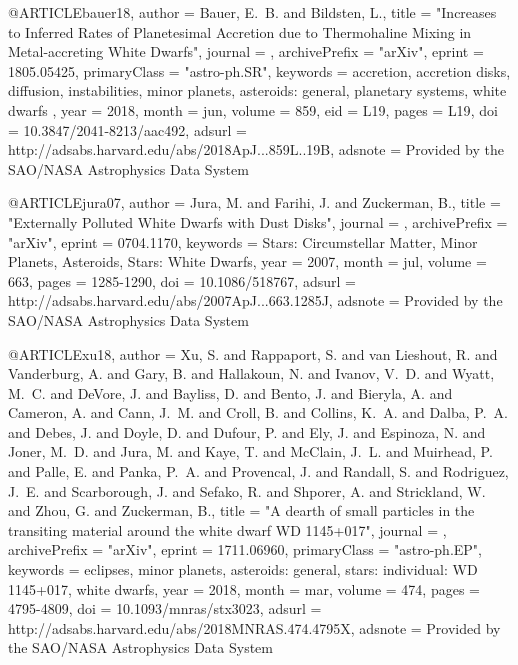 \documentclass[a4paper,fleqn,usenatbib]{mnras}
\begin{document}
{{{{{{@ARTICLE{bauer18,
   author = {{Bauer}, E.~B. and {Bildsten}, L.},
    title = "{Increases to Inferred Rates of Planetesimal Accretion due to Thermohaline Mixing in Metal-accreting White Dwarfs}",
  journal = {\apjl},
archivePrefix = "arXiv",
   eprint = {1805.05425},
 primaryClass = "astro-ph.SR",
 keywords = {accretion, accretion disks, diffusion, instabilities, minor planets, asteroids: general, planetary systems, white dwarfs },
     year = 2018,
    month = jun,
   volume = 859,
      eid = {L19},
    pages = {L19},
      doi = {10.3847/2041-8213/aac492},
   adsurl = {http://adsabs.harvard.edu/abs/2018ApJ...859L..19B},
  adsnote = {Provided by the SAO/NASA Astrophysics Data System}
}


@ARTICLE{jura07,
   author = {{Jura}, M. and {Farihi}, J. and {Zuckerman}, B.},
    title = "{Externally Polluted White Dwarfs with Dust Disks}",
  journal = {\apj},
archivePrefix = "arXiv",
   eprint = {0704.1170},
 keywords = {Stars: Circumstellar Matter, Minor Planets, Asteroids, Stars: White Dwarfs},
     year = 2007,
    month = jul,
   volume = 663,
    pages = {1285-1290},
      doi = {10.1086/518767},
   adsurl = {http://adsabs.harvard.edu/abs/2007ApJ...663.1285J},
  adsnote = {Provided by the SAO/NASA Astrophysics Data System}
}

@ARTICLE{xu18,
   author = {{Xu}, S. and {Rappaport}, S. and {van Lieshout}, R. and {Vanderburg}, A. and 
	{Gary}, B. and {Hallakoun}, N. and {Ivanov}, V.~D. and {Wyatt}, M.~C. and 
	{DeVore}, J. and {Bayliss}, D. and {Bento}, J. and {Bieryla}, A. and 
	{Cameron}, A. and {Cann}, J.~M. and {Croll}, B. and {Collins}, K.~A. and 
	{Dalba}, P.~A. and {Debes}, J. and {Doyle}, D. and {Dufour}, P. and 
	{Ely}, J. and {Espinoza}, N. and {Joner}, M.~D. and {Jura}, M. and 
	{Kaye}, T. and {McClain}, J.~L. and {Muirhead}, P. and {Palle}, E. and 
	{Panka}, P.~A. and {Provencal}, J. and {Randall}, S. and {Rodriguez}, J.~E. and 
	{Scarborough}, J. and {Sefako}, R. and {Shporer}, A. and {Strickland}, W. and 
	{Zhou}, G. and {Zuckerman}, B.},
    title = "{A dearth of small particles in the transiting material around the white dwarf WD 1145+017}",
  journal = {\mnras},
archivePrefix = "arXiv",
   eprint = {1711.06960},
 primaryClass = "astro-ph.EP",
 keywords = {eclipses, minor planets, asteroids: general, stars: individual: WD 1145+017, white dwarfs},
     year = 2018,
    month = mar,
   volume = 474,
    pages = {4795-4809},
      doi = {10.1093/mnras/stx3023},
   adsurl = {http://adsabs.harvard.edu/abs/2018MNRAS.474.4795X},
  adsnote = {Provided by the SAO/NASA Astrophysics Data System}
}



}}}}}}
\end{document}
